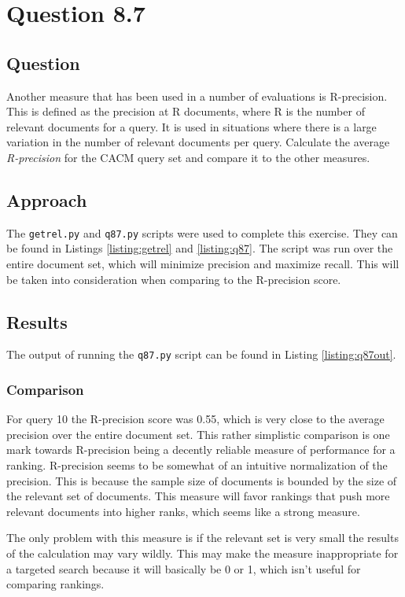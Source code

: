 \section{Question 8.7}

\subsection{Question}
Another measure that has been used in a number of evaluations is R-precision.  This is defined as the precision at R documents, where R is the number of relevant documents for a query. It is used in situations where there is a large variation in the number of relevant documents per query. Calculate the average \textit{R-precision} for the CACM query set and compare it to the other measures.

\subsection{Approach}
The \texttt{getrel.py} and \texttt{q87.py} scripts were used to complete this exercise.  They can be found in Listings \ref{listing:getrel} and \ref{listing:q87}.  The script was run over the entire document set, which will minimize precision and maximize recall.  This will be taken into consideration when comparing to the R-precision score.

\subsection{Results}
The output of running the \texttt{q87.py} script can be found in Listing \ref{listing:q87out}.



\subsubsection{Comparison}
For query 10 the R-precision score was 0.55, which is very close to the average precision over the entire document set.  This rather simplistic comparison is one mark towards R-precision being a decently reliable measure of performance for a ranking.  R-precision seems to be somewhat of an intuitive normalization of the precision.  This is because the sample size of documents is bounded by the size of the relevant set of documents.  This measure will favor rankings that push more relevant documents into higher ranks, which seems like a strong measure.  

The only problem with this measure is if the relevant set is very small the results of the calculation may vary wildly.  This may make the measure inappropriate for a targeted search because it will basically be 0 or 1, which isn't useful for comparing rankings.
